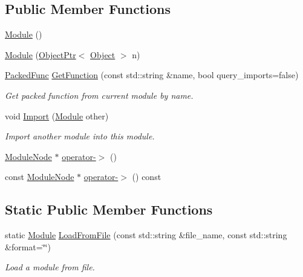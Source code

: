 \subsection*{Public Member Functions}
\begin{DoxyCompactItemize}
\item 
\hyperlink{classtvm_1_1runtime_1_1Module_abfbc619b3b3166d63ec52e399c24bed9}{Module} ()
\item 
\hyperlink{classtvm_1_1runtime_1_1Module_abd1380b3f813c2b6acefca3aaef425f4}{Module} (\hyperlink{classtvm_1_1runtime_1_1ObjectPtr}{Object\+Ptr}$<$ \hyperlink{classtvm_1_1runtime_1_1Object}{Object} $>$ n)
\item 
\hyperlink{classtvm_1_1runtime_1_1PackedFunc}{Packed\+Func} \hyperlink{classtvm_1_1runtime_1_1Module_a1233f7b896bb299ef07f9e41a4ffdc17}{Get\+Function} (const std\+::string \&name, bool query\+\_\+imports=false)
\begin{DoxyCompactList}\small\item\em Get packed function from current module by name. \end{DoxyCompactList}\item 
void \hyperlink{classtvm_1_1runtime_1_1Module_afb5a6c9b0e0a541245958456ebe39260}{Import} (\hyperlink{classtvm_1_1runtime_1_1Module}{Module} other)
\begin{DoxyCompactList}\small\item\em Import another module into this module. \end{DoxyCompactList}\item 
\hyperlink{classtvm_1_1runtime_1_1ModuleNode}{Module\+Node} $\ast$ \hyperlink{classtvm_1_1runtime_1_1Module_a87bcc010c62887a453d49d46854fa354}{operator-\/$>$} ()
\item 
const \hyperlink{classtvm_1_1runtime_1_1ModuleNode}{Module\+Node} $\ast$ \hyperlink{classtvm_1_1runtime_1_1Module_a814b0e825cb2a4e47a797c22a397582f}{operator-\/$>$} () const 
\end{DoxyCompactItemize}
\subsection*{Static Public Member Functions}
\begin{DoxyCompactItemize}
\item 
static \hyperlink{classtvm_1_1runtime_1_1Module}{Module} \hyperlink{classtvm_1_1runtime_1_1Module_a1927112ff253c1a6150238257cc9d5dd}{Load\+From\+File} (const std\+::string \&file\+\_\+name, const std\+::string \&format=\char`\"{}\char`\"{})
\begin{DoxyCompactList}\small\item\em Load a module from file. \end{DoxyCompactList}\end{DoxyCompactItemize}
